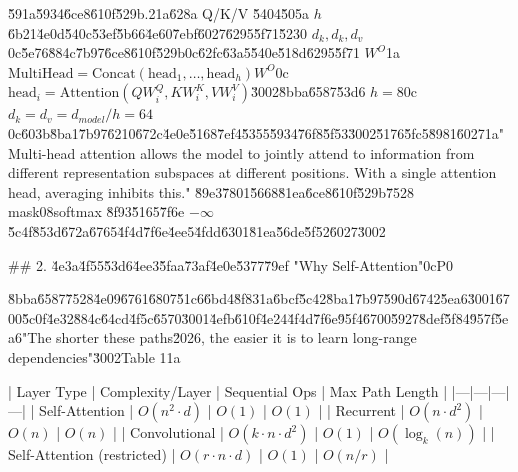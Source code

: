 \documentclass[10pt]{article}
\begin{document}
\begin{AnswerText}
\u591a\u5934\u6ce8\u610f\u529b.2\uff1a\u628a Q/K/V \u5404\u505a $h$ \u6b21\u4e0d\u540c\u53ef\u5b66\u4e60\u7ebf\u6027\u6295\u5f71\u5230 $d_k,d_k,d_v$\uff0c\u5e76\u884c\u7b97\u6ce8\u610f\u529b\uff0c\u62fc\u63a5\u540e\u518d\u6295\u5f71 $W^O$\uff1a$\mathrm{MultiHead}=\mathrm{Concat}(\mathrm{head}_1,\dots,\mathrm{head}_h)W^O$\uff0c$\mathrm{head}_i=\mathrm{Attention}(QW_i^Q,KW_i^K,VW_i^V)$\u3002\u8bba\u6587\u53d6 $h=8$\uff0c$d_k=d_v=d_{model}/h=64$\uff0c\u603b\u8ba1\u7b97\u6210\u672c\u4e0e\u5168\u7ef4\u5355\u5934\u76f8\u5f53\u3002\u5176\u5fc5\u8981\u6027\uff1a"Multi-head attention allows the model to jointly attend to information from different representation subspaces at different positions. With a single attention head, averaging inhibits this." \u89e3\u7801\u5668\u81ea\u6ce8\u610f\u529b\u7528 mask\uff08softmax \u8f93\u5165\u7f6e $-\infty$\u5c4f\u853d\u672a\u6765\u4f4d\u7f6e\u4ee5\u4fdd\u6301\u81ea\u56de\u5f52\u6027\u3002

## 2. \u4e3a\u4f55\u53d6\u4ee3\u5faa\u73af\u4e0e\u5377\u79ef "Why Self-Attention"\uff0cP0

\u8bba\u6587\u7528\u4e09\u6761\u6807\u51c6\u6bd4\u8f83\uff1a\u6bcf\u5c42\u8ba1\u7b97\u590d\u6742\u5ea6\u3001\u6700\u5c0f\u4e32\u884c\u64cd\u4f5c\u6570\u3001\u4efb\u610f\u4e24\u4f4d\u7f6e\u95f4\u6700\u5927\u8def\u5f84\u957f\u5ea6"The shorter these paths\u2026, the easier it is to learn long-range dependencies"\u3002Table 1\uff1a

| Layer Type | Complexity/Layer | Sequential Ops | Max Path Length |
|---|---|---|---|
| Self-Attention | $O(n^2\cdot d)$ | $O(1)$ | $O(1)$ |
| Recurrent | $O(n\cdot d^2)$ | $O(n)$ | $O(n)$ |
| Convolutional | $O(k\cdot n\cdot d^2)$ | $O(1)$ | $O(\log_k(n))$ |
| Self-Attention (restricted) | $O(r\cdot n\cdot d)$ | $O(1)$ | $O(n/r)$ |


\end{AnswerText}
\end{document}

